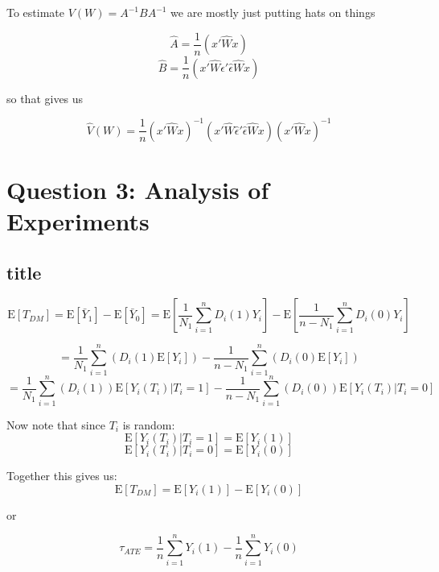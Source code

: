 \documentclass[11pt]{article}
\newcommand{\E}{\mathrm{E}}
\begin{document}
To estimate $V(W) = A^{-1}BA^{-1} $ we are mostly just putting hats on things 

$$\hat{A} = \frac{1}{n}(x'\hat{W}x)$$ 
$$\hat{B} = \frac{1}{n}(x'\hat{W} \hat{\epsilon}' \hat{\epsilon} \hat{W}x)$$

 so that gives us 
 
 $$ \hat{V}(W) = \frac{1}{n} (x'\hat{W}x)^{-1} (x'\hat{W} \hat{\epsilon}' \hat{\epsilon} \hat{W}x) (x'\hat{W}x)^{-1} $$
 
 \section{Question 3: Analysis of Experiments}
 
 \subsection{title}
 
 $$\E[T_{DM}] = \E[\bar{Y}_1] - \E[\bar{Y}_0] = \E \left[ \frac{1}{N_1} \sum_{i=1}^{n} D_i(1) Y_i  \right]  
 -  \E \left[ \frac{1}{n-N_1} \sum_{i=1}^{n} D_i(0) Y_i  \right]  $$
 
 $$ =  \frac{1}{N_1} \sum_{i=1}^{n} \left(  D_i(1) \E[Y_i] \right) - \frac{1}{n-N_1} \sum_{i=1}^{n} \left(  D_i(0) \E[Y_i] \right) $$
 $$=  \frac{1}{N_1} \sum_{i=1}^{n} \left( D_i(1) \right) \E[Y_i(T_i)|T_i = 1]  - \frac{1}{n-N_1} \sum_{i=1}^{n} \left( D_i(0) \right) \E[Y_i(T_i)|T_i =0] $$
 
 Now note that since $T_i$ is random: 
 $$ \E[Y_i(T_i)|T_i = 1] = \E[Y_i(1)] $$
 $$ \E[Y_i(T_i)|T_i = 0] = \E[Y_i(0)] $$
 
 Together this gives us: 
  $$\E[T_{DM}] = \E[Y_i(1)] - \E[Y_i(0)] $$
  
 or
 
 $$\tau_{ATE} = \frac{1}{n} \sum_{i=1}^{n} Y_i(1) - \frac{1}{n} \sum_{i=1}^{n} Y_i(0) $$
\end{document}
